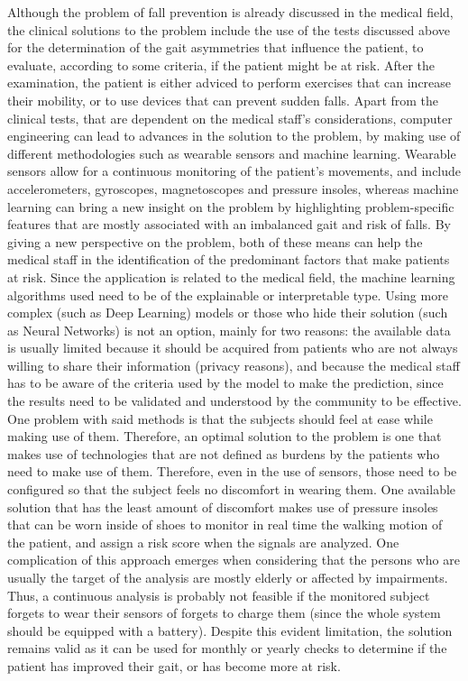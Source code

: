 Although the problem of fall prevention is already discussed in the medical field, the clinical solutions to the problem include the use of the tests discussed above for the determination of the gait asymmetries 
that influence the patient, to evaluate, according to some criteria, if the patient might be at risk. After the examination, the patient is either adviced to perform exercises that can increase their mobility, or to use devices that can prevent sudden falls.
Apart from the clinical tests, that are dependent on the medical staff's considerations, computer engineering can lead to advances in the solution to the problem, by making use of different methodologies such as wearable sensors and machine learning. 
Wearable sensors allow for a continuous monitoring of the patient's movements, and include accelerometers, gyroscopes, magnetoscopes and pressure insoles, whereas machine learning can bring a new insight on the problem by highlighting problem-specific features that are mostly associated with an imbalanced gait and risk of falls. By giving a new perspective on the problem, both of these means can help the medical staff in the identification of the predominant factors that make patients at risk.
Since the application is related to the medical field, the machine learning algorithms used need to be of the explainable or interpretable type. Using more complex (such as Deep Learning) models or those who hide their solution (such as Neural Networks) is not an option, mainly for two reasons:
the available data is usually limited because it should be acquired from patients who are not always willing to share their information (privacy reasons), and because the medical staff has to be aware of the criteria used by the model to make the prediction, since the results need to be validated and understood by the community to be effective.
One problem with said methods is that the subjects should feel at ease while making use of them. Therefore, an optimal solution to the problem is one that makes use of technologies that are not defined as burdens by the patients who need to make use of them. Therefore, even in the use of
sensors, those need to be configured so that the subject feels no discomfort in wearing them. One available solution that has the least amount of discomfort makes use of pressure insoles that can be worn inside of shoes to monitor in real time the walking motion of the patient, and assign a risk score
when the signals are analyzed. 
One complication of this approach emerges when considering that the persons who are usually the target of the analysis are mostly elderly or affected by impairments.
Thus, a continuous analysis is probably not feasible if the monitored subject forgets to wear their sensors of forgets to charge them (since the whole system should be equipped with a battery).
Despite this evident limitation, the solution remains valid as it can be used for monthly or yearly checks to determine if the patient has improved their gait, or has become more at risk.
